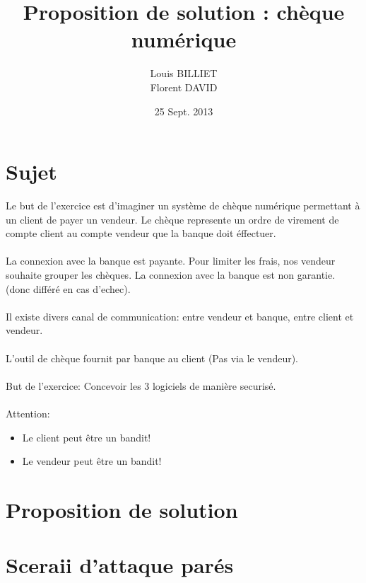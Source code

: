 \documentclass[oneside,12pt]{article}
\begin{document}
\title{Proposition de solution : ch\`eque num\'erique}
\author{Louis BILLIET \\ Florent DAVID}
\date{25 Sept. 2013}
\maketitle

\section{Sujet}
Le but de l'exercice est d'imaginer un syst\`eme de ch\`eque num\'erique permettant \`a un client de payer un vendeur.
Le ch\`eque represente un ordre de virement de compte client au compte vendeur que la banque doit \'effectuer.
\\
\\
La connexion avec la banque est payante. Pour limiter les frais, nos vendeur souhaite grouper les ch\`eques. 
La connexion avec la banque est non garantie. (donc diff\'er\'e en cas d'echec).
\\
\\
Il existe divers canal de communication: entre vendeur et banque, entre client et vendeur.
\\
\\
L'outil de ch\`eque fournit par banque au client (Pas via  le vendeur).
\\
\\
But de l'exercice: Concevoir les 3 logiciels de mani\`ere securis\'e.
\\
\\
Attention:
\begin{itemize}
  \item Le client peut \^etre un bandit!
  \item Le vendeur peut \^etre un bandit!
\end{itemize}

\section{}

\section{Proposition de solution}

\section{Sceraii d'attaque par\'es}
\end{document}
